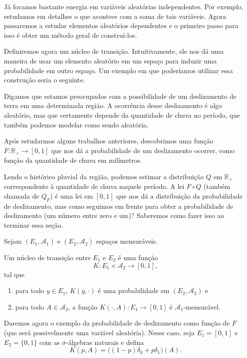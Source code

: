 Já focamos bastante energia em variáveis aleatórias independentes.
Por exemplo, estudamos em detalhes o que acontece com a soma de tais variáveis.
Agora passaremos a estudar elementos aleatórios dependentes e o primeiro passo para isso é obter um método geral de construí-los.

Definiremos agora um núcleo de transição.
Intuitivamente, ele nos dá uma maneira de usar um elemento aleatório em um espaço para induzir uma probabilidade em outro espaço.
Um exemplo em que poderíamos utilizar essa construção seria o seguinte.

Digamos que estamos preocupados com a possibilidade de um deslizamento de terra em uma determinada região.
A ocorrência desse deslizamento é algo aleatório, mas que certamente depende da quantidade de chuva no período, que também podemos modelar como sendo aleatória.

Após estudarmos alguns trabalhos anteriores, descobrimos uma função $F:\mathbb{R}_+ \to [0,1]$ que nos dá a probabilidade de um deslizamento ocorrer, como função da quantidade de chuva em milímetros.

Lendo o histórico pluvial da região, podemos estimar a distribuição $Q$ em $\mathbb{R}_+$ correspondente à quantidade de chuva naquele período.
A lei $F \circ Q$ (também chamada de $Q_F$) é uma lei em $[0,1]$ que nos dá a distribuição da probabilidade de deslizamento, mas como seguimos em frente para obter a probabilidade de deslizamento (um número entre zero e um)?
Saberemos como fazer isso ao terminar essa seção.

Sejam $(E_1, \mathcal{A}_1)$ e $(E_2, \mathcal{A}_2)$ espaços mensuráveis.
\begin{definition}
  Um núcleo de transição entre $E_1$ e $E_2$ é uma função 
  \begin{equation}
    K: E_1 \times \mathcal{A}_2 \to [0,1],
  \end{equation}
  tal que
  \begin{enumerate}[\quad a)]
  \item para todo $y \in E_1$, $K(y,\cdot)$ é uma probabilidade em $(E_2, \mathcal{A}_2)$ e
  \item para todo $A \in \mathcal{A}_2$, a função $K(\cdot, A): E_1 \to [0,1]$ é $\mathcal{A}_1$-mensurável.
  \end{enumerate}
\end{definition}

\begin{example}
  \label{x:chance_deslizamento}
  Daremos agora o exemplo da probabilidade de deslizamento como função de $F$ (que será possivelmente uma variável aleatória).
  Nesse caso, seja $E_1 = [0,1]$ e $E_2 = \{0,1\}$ com as $\sigma$-álgebras naturais e defina
  \begin{equation}
    K(p, A) = \big( (1-p)\delta_0 + p \delta_1 \big) (A).
  \end{equation}
\end{example}

